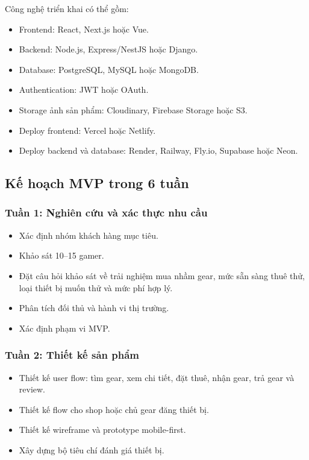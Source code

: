 Công nghệ triển khai có thể gồm:

\begin{itemize}
    \item Frontend: React, Next.js hoặc Vue.
    \item Backend: Node.js, Express/NestJS hoặc Django.
    \item Database: PostgreSQL, MySQL hoặc MongoDB.
    \item Authentication: JWT hoặc OAuth.
    \item Storage ảnh sản phẩm: Cloudinary, Firebase Storage hoặc S3.
    \item Deploy frontend: Vercel hoặc Netlify.
    \item Deploy backend và database: Render, Railway, Fly.io, Supabase hoặc Neon.
\end{itemize}

\subsection{Kế hoạch MVP trong 6 tuần}

\subsubsection{Tuần 1: Nghiên cứu và xác thực nhu cầu}

\begin{itemize}
    \item Xác định nhóm khách hàng mục tiêu.
    \item Khảo sát 10--15 gamer.
    \item Đặt câu hỏi khảo sát về trải nghiệm mua nhầm gear, mức sẵn sàng thuê thử, loại thiết bị muốn thử và mức phí hợp lý.
    \item Phân tích đối thủ và hành vi thị trường.
    \item Xác định phạm vi MVP.
\end{itemize}

\subsubsection{Tuần 2: Thiết kế sản phẩm}

\begin{itemize}
    \item Thiết kế user flow: tìm gear, xem chi tiết, đặt thuê, nhận gear, trả gear và review.
    \item Thiết kế flow cho shop hoặc chủ gear đăng thiết bị.
    \item Thiết kế wireframe và prototype mobile-first.
    \item Xây dựng bộ tiêu chí đánh giá thiết bị.
\end{itemize}

